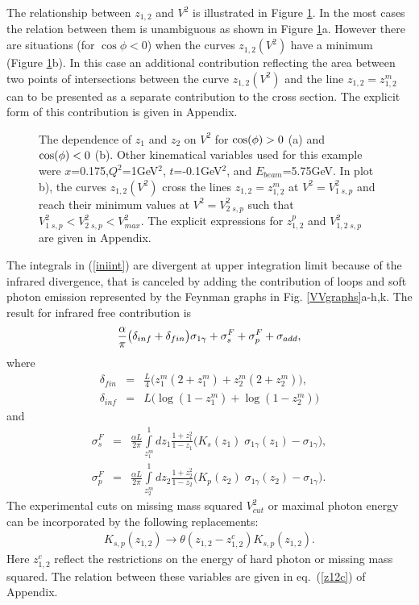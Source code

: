\documentclass[aps,prd,reprint,groupedaddress,preprintnumbers,showpacs]{revtex4-1}
\begin{document}
The relationship between $z_{1,2}$ and $V^2$ is illustrated in Figure \ref{zvv2rel}. In the most cases the relation between them is unambiguous as shown in Figure \ref{zvv2rel}a. 
However there are situations (for $\cos\phi<0$) when the curves $z_{1,2}(V^2)$ have a minimum (Figure \ref{zvv2rel}b). In this case an additional contribution reflecting the area between two points of intersections between the curve $z_{1,2}(V^2)$ and the line $z_{1,2}=z^m_{1,2}$ can to be presented as a separate contribution to the cross section. The explicit form of this contribution is given in Appendix. 

\begin{figure}\centering
{}
\caption{\label{zvv2rel}The dependence of $z_1$ and $z_2$ on $V^2$ for $\protect\cos(\protect\phi)>0$ (a) and 
$\protect\cos(\protect\phi)<0$ (b). Other kinematical variables used for this example were 
$x$=0.175,$Q^2$=1GeV$^2$, $t$=-0.1GeV$^2$, and $E_{beam}$=5.75GeV.
In plot b), the curves $z_{1,2}(V^2)$ cross the lines $z_{1,2}=z_{1,2}^m$ at $V^2=V^2_{1\;s,p}$ 
and reach their minimum values at $V^2=V^2_{2\;s,p}$ such that $V^2_{1\;s,p}<V^2_{2\;s,p}<V^2_{max}$. The explicit expressions for $z_{1,2}^p$
and $V^2_{1,2\;s,p}$ are given in Appendix. }
 \end{figure}


 
 The integrals in (\ref{iniint}) are divergent at upper integration limit because of the infrared divergence, that is canceled by adding the contribution of  loops and soft photon emission \cite{ByKuTo2008PRC} represented by the Feynman graphs in Fig. \ref{VVgraphs}a-h,k. The result for infrared free contribution is
 \begin{equation}
{\alpha \over \pi} \bigl( \delta_{inf}+\delta_{fin}\bigr) \sigma _{1\gamma}+ \sigma_s^F+\sigma_p^F+\sigma_{add},
\end{equation}
where 
\begin{eqnarray}
\delta_{fin}&=&\frac{L}{4}\bigl(z_1^m(2+z_1^m)+z_2^m(2+z_2^m)\bigr), 
\nonumber
\\
\delta_{inf}&=&L\bigl( \log(1-z_1^m)+\log(1-z_2^m)\bigr)
\label{twodeltas}
\end{eqnarray}
and 
\begin{eqnarray} \label{sigmaF}
\sigma _s^F&=&\frac{\alpha L}{2\pi }
\int\limits_{z_1^m}^1 dz_1 \frac {1+z_1^2}{1-z_1}
\biggl(
K_s(z_1)
\;\sigma _{1\gamma}(z_1)
-
\sigma _{1\gamma}\biggr),
\nonumber
\\
\sigma _p^F&=&\frac{\alpha L}{2\pi }
\int\limits_{z_2^m}^1 dz_2 \frac {1+z_2^2}{1-z_2} 
\biggl( 
K_p(z_2)
\;\sigma _{1\gamma}(z_2)
-
\sigma _{1\gamma}\biggr)
.
\label{1l}
\end{eqnarray}
The experimental cuts on missing mass squared $V_{cut}^2$ or maximal photon energy can be incorporated 
by the following replacements:
\begin{eqnarray}
K_{s,p}(z_{1,2})\rightarrow \theta(z_{1,2}-z_{1,2}^c) K_{s,p}(z_{1,2}).
\end{eqnarray}
Here $z_{1,2}^c$ reflect the restrictions on the energy of hard photon or missing mass squared. The relation between these variables 
are given in eq.~(\ref{z12c}) of Appendix.
\end{document}
